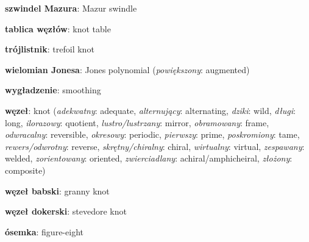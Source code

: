 \item \textbf{szwindel Mazura}: Mazur swindle
\item \textbf{tablica węzłów}: knot table
\item \textbf{trójlistnik}: trefoil knot
\item \textbf{wielomian Jonesa}: Jones polynomial
(\emph{powiększony}: augmented)
\item \textbf{wygładzenie}: smoothing
\item \textbf{węzeł}: knot
(\emph{adekwatny}: adequate, \emph{alternujący}: alternating, \emph{dziki}: wild, \emph{długi}: long, \emph{ilorazowy}: quotient, \emph{lustro/lustrzany}: mirror, \emph{obramowany}: frame, \emph{odwracalny}: reversible, \emph{okresowy}: periodic, \emph{pierwszy}: prime, \emph{poskromiony}: tame, \emph{rewers/odwrotny}: reverse, \emph{skrętny/chiralny}: chiral, \emph{wirtualny}: virtual, \emph{zespawany}: welded, \emph{zorientowany}: oriented, \emph{zwierciadlany}: achiral/amphicheiral, \emph{złożony}: composite)
\item \textbf{węzeł babski}: granny knot
\item \textbf{węzeł dokerski}: stevedore knot
\item \textbf{ósemka}: figure-eight
